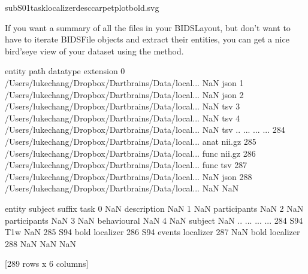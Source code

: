 \documentclass[letterpaper,10pt,english]{sphinxmanual}
\begin{document}
\begin{sphinxVerbatim}[commandchars=\\\{\}]
\PYGZsq{}sub\PYGZhy{}S01\PYGZus{}task\PYGZhy{}localizer\PYGZus{}desc\PYGZhy{}carpetplot\PYGZus{}bold.svg\PYGZsq{}
\end{sphinxVerbatim}

If you want a summary of all the files in your BIDSLayout, but don’t want to have to iterate BIDSFile objects and extract their entities, you can get a nice bird’s\sphinxhyphen{}eye view of your dataset using the  method.

\begin{sphinxVerbatim}[commandchars=\\\{\}]
\end{sphinxVerbatim}

\begin{sphinxVerbatim}[commandchars=\\\{\}]
entity                                               path datatype extension  \PYGZbs{}
0       /Users/lukechang/Dropbox/Dartbrains/Data/local...      NaN      json   
1       /Users/lukechang/Dropbox/Dartbrains/Data/local...      NaN      json   
2       /Users/lukechang/Dropbox/Dartbrains/Data/local...      NaN       tsv   
3       /Users/lukechang/Dropbox/Dartbrains/Data/local...      NaN       tsv   
4       /Users/lukechang/Dropbox/Dartbrains/Data/local...      NaN       tsv   
..                                                    ...      ...       ...   
284     /Users/lukechang/Dropbox/Dartbrains/Data/local...     anat    nii.gz   
285     /Users/lukechang/Dropbox/Dartbrains/Data/local...     func    nii.gz   
286     /Users/lukechang/Dropbox/Dartbrains/Data/local...     func       tsv   
287     /Users/lukechang/Dropbox/Dartbrains/Data/local...      NaN      json   
288     /Users/lukechang/Dropbox/Dartbrains/Data/local...      NaN       NaN   

entity subject        suffix       task  
0          NaN   description        NaN  
1          NaN  participants        NaN  
2          NaN  participants        NaN  
3          NaN   behavioural        NaN  
4          NaN       subject        NaN  
..         ...           ...        ...  
284        S94           T1w        NaN  
285        S94          bold  localizer  
286        S94        events  localizer  
287        NaN          bold  localizer  
288        NaN           NaN        NaN  

[289 rows x 6 columns]
\end{sphinxVerbatim}
\end{document}
